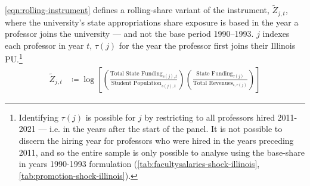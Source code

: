 \documentclass[notitlepage,12pt]{article}
\renewcommand{\tilde}[1]{\widetilde{#1}}                                   %
\begin{document}
\autoref{eqn:rolling-instrument} defines a rolling-share variant of the instrument, $\tilde Z_{j,t}$, where the university's state appropriations share exposure is based in the year a professor joins the university --- and not the base period 1990--1993.
$j$ indexes each professor in year $t$, $\tau(j)$ for the year the professor first joins their Illinois PU.\footnote{
    Identifying $\tau(j)$ is possible for $j$ by restricting to all professors hired 2011-2021 --- i.e. in the years after the start of the panel.
    It is not possible to discern the hiring year for professors who  were hired in the years preceding 2011, and so the entire sample is only possible to analyse using the base-share in years 1990-1993 formulation (\autoref{tab:facultysalaries-shock-illinois}, \ref{tab:promotion-shock-illinois}).
}
\begin{align}
    \label{eqn:rolling-instrument}
    \tilde Z_{j,t} &\coloneqq \log \left[
    \left( \frac{\text{Total State Funding}_{s(j),t}}{\text{Student Population}_{s(j),t}} \right)
    \left( \frac{\text{State Funding}_{\tau(j)}}{\text{Total Revenues}_{i,\tau(j)}} \right) \right]
\end{align}
\end{document}
